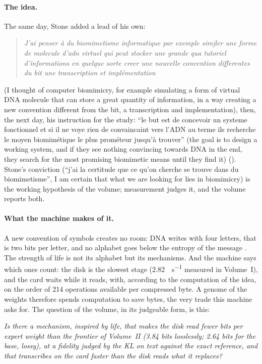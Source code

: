 \paragraph{The idea.} The same day, Stone added a lead of his own:
\begin{quote}\itshape
J'ai penser à du biomimetisme informatique par exemple simjler une forme de molecule d'adn virtuel qui peut stocker une grande qua tutoriel d'informations en quelque sorte creer une nouvelle convention differentes du bit une transcription et implémentation
\end{quote}
(I thought of computer biomimicry, for example simulating a form of virtual DNA molecule that can store a great quantity of information, in a way creating a new convention different from the bit, a transcription and implementation), then, the next day, his instruction for the study: ``le but est de concevoir un systeme fonctionnel et si il ne voye rien de convaincaint vers l'ADN au terme ils recherche le moyen biomimétique le plus prométeur jusqu'à trouver'' (the goal is to design a working system, and if they see nothing convincing towards DNA in the end, they search for the most promising biomimetic means until they find it) (). Stone's conviction (``j'ai la certitude que ce qu'on cherche se trouve dans du biomimetisme'', I am certain that what we are looking for lies in biomimicry) is the working hypothesis of the volume; measurement judges it, and the volume reports both.

\paragraph{What the machine makes of it.} A new convention of symbols creates no room: DNA writes with four letters, that is two bits per letter, and no alphabet goes below the entropy of the message \parencite{shannon1948,cover2006}. The strength of life is not its alphabet but its mechanisms. And the machine says which ones count: the disk is the slowest stage (\SI{2.82}{\Go\per\second} measured in Volume~I), and the card waits while it reads, with, according to the computation of the idea, on the order of 214 operations available per compressed byte. A genome of the weights therefore spends computation to save bytes, the very trade this machine asks for. The question of the volume, in its judgeable form, is this:

\begin{center}
\begin{tcolorbox}[enhanced, width=0.92\linewidth, colback=Fond, colframe=Accent, boxrule=0.6pt, arc=1pt]
\emph{Is there a mechanism, inspired by life, that makes the disk read fewer bits per expert weight than the frontier of Volume~II (\num{3.84} bits losslessly; \num{2.64} bits for the base, lossy), at a fidelity judged by the KL on text against the exact reference, and that transcribes on the card faster than the disk reads what it replaces?}
\end{tcolorbox}
\end{center}

